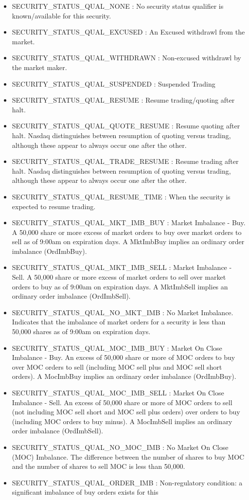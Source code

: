\begin{itemize}
\item SECURITY\_\-STATUS\_\-QUAL\_\-NONE : No security status qualifier is known/available for this security. \item SECURITY\_\-STATUS\_\-QUAL\_\-EXCUSED : An Excused withdrawl from the market. \item SECURITY\_\-STATUS\_\-QUAL\_\-WITHDRAWN : Non-excused withdrawl by the market maker. \item SECURITY\_\-STATUS\_\-QUAL\_\-SUSPENDED : Suspended Trading \item SECURITY\_\-STATUS\_\-QUAL\_\-RESUME : Resume trading/quoting after halt. \item SECURITY\_\-STATUS\_\-QUAL\_\-QUOTE\_\-RESUME : Resume quoting after halt. Nasdaq distinguishes between resumption of quoting versus trading, although these appear to always occur one after the other. \item SECURITY\_\-STATUS\_\-QUAL\_\-TRADE\_\-RESUME : Resume trading after halt. Nasdaq distinguishes between resumption of quoting versus trading, although these appear to always occur one after the other. \item SECURITY\_\-STATUS\_\-QUAL\_\-RESUME\_\-TIME : When the security is expected to resume trading. \item SECURITY\_\-STATUS\_\-QUAL\_\-MKT\_\-IMB\_\-BUY : Market Imbalance - Buy. A 50,000 share or more excess of market orders to buy over market orders to sell as of 9:00am on expiration days. A Mkt\-Imb\-Buy implies an ordinary order imbalance (Ord\-Imb\-Buy). \item SECURITY\_\-STATUS\_\-QUAL\_\-MKT\_\-IMB\_\-SELL : Market Imbalance - Sell. A 50,000 share or more excess of market orders to sell over market orders to buy as of 9:00am on expiration days. A Mkt\-Imb\-Sell implies an ordinary order imbalance (Ord\-Imb\-Sell). \item SECURITY\_\-STATUS\_\-QUAL\_\-NO\_\-MKT\_\-IMB : No Market Imbalance. Indicates that the imbalance of market orders for a security is less than 50,000 shares as of 9:00am on expiration days. \item SECURITY\_\-STATUS\_\-QUAL\_\-MOC\_\-IMB\_\-BUY : Market On Close Imbalance - Buy. An excess of 50,000 share or more of MOC orders to buy over MOC orders to sell (including MOC sell plus and MOC sell short orders). A Moc\-Imb\-Buy implies an ordinary order imbalance (Ord\-Imb\-Buy). \item SECURITY\_\-STATUS\_\-QUAL\_\-MOC\_\-IMB\_\-SELL : Market On Close Imbalance - Sell. An excess of 50,000 share or more of MOC orders to sell (not including MOC sell short and MOC sell plus orders) over orders to buy (including MOC orders to buy minus). A Moc\-Imb\-Sell implies an ordinary order imbalance (Ord\-Imb\-Sell). \item SECURITY\_\-STATUS\_\-QUAL\_\-NO\_\-MOC\_\-IMB : No Market On Close (MOC) Imbalance. The difference between the number of shares to buy MOC and the number of shares to sell MOC is less than 50,000. \item SECURITY\_\-STATUS\_\-QUAL\_\-ORDER\_\-IMB : Non-regulatory condition: a significant imbalance of buy orders exists for this 
\end{itemize}
